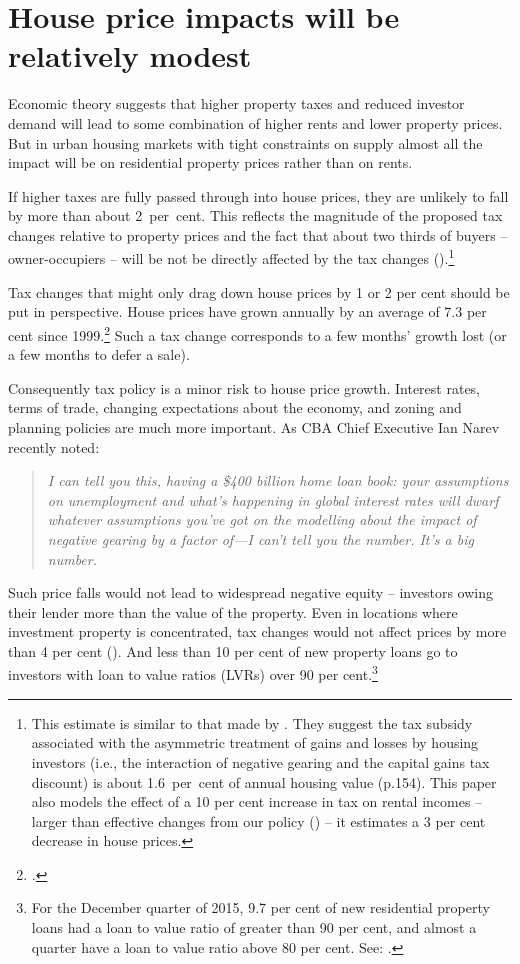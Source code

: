 \section{House price impacts will be relatively modest}
Economic theory suggests that higher property taxes and reduced investor demand will lead to some combination of higher rents and lower property prices. But in urban housing markets with tight constraints on supply almost all the impact will be on residential property prices rather than on rents.

If higher taxes are fully passed through into house prices, they are unlikely to fall by more than about 2~per~cent. This reflects the magnitude of the proposed tax changes relative to property prices and the fact that about two thirds of buyers – owner-occupiers – will be not be directly affected by the tax changes ().\footnote{This estimate is similar to that made by \textcite[][154]{AbelsonJoyeux2007}. They suggest the tax subsidy associated with the asymmetric treatment of gains and losses by housing investors (i.e., the interaction of negative gearing and the capital gains tax discount) is about 1.6~per~cent of annual housing value (p.154). This paper also models the effect of a 10 per cent increase in tax on rental incomes – larger than effective changes from our policy () – it estimates a 3 per cent decrease in house prices.}

Tax changes that might only drag down house prices by 1 or 2 per cent should be put in perspective. House prices have grown annually by an average of 7.3 per cent since 1999.\footcites{ABS2015ResidentialPropertyIndex}{Yates2011}
Such a tax change corresponds to a few months’ growth lost (or a few months to defer a sale).

Consequently tax policy is a minor risk to house price growth.  Interest rates, terms of trade, changing expectations about the economy, and zoning and planning policies are much more important. As CBA Chief Executive Ian Narev recently noted:

\begin{quote} 
\textit{I can tell you this, having a \$400 billion home loan book: your assumptions on unemployment and what's happening in global interest rates will dwarf whatever assumptions you've got on the modelling about the impact of negative gearing by a factor of---I can't tell you the number. It's a big number.}
\end{quote}

Such price falls would not lead to widespread negative equity – investors owing their lender more than the value of the property. Even in locations where investment property is concentrated, tax changes would not affect prices by more than 4 per cent (). And less than 10 per cent of new property loans go to investors with loan to value ratios (LVRs) over 90 per cent.\footnote{For the December quarter of 2015, 9.7 per cent of new residential property loans had a loan to value ratio of greater than 90 per cent, and almost a quarter have a loan to value ratio above 80 per cent. See: \textcite{APRA2016PropertyExposures}.}

